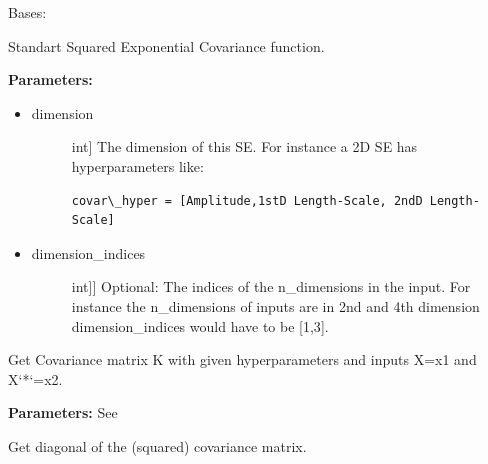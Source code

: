 \documentclass[letterpaper,10pt,english]{sphinxmanual}
\begin{document}
\begin{fulllineitems}
\label{covars:pygp.covar.se.SqexpCFARD}
Bases: 

Standart Squared Exponential Covariance function.

\textbf{Parameters:}
\begin{itemize}
\item {} \begin{description}
\item[{dimension}] \leavevmode{[}int{]}
The dimension of this SE. For instance a 2D SE has
hyperparameters like:

\begin{Verbatim}[commandchars=\\\{\}]
covar\_hyper = [Amplitude,1stD Length-Scale, 2ndD Length-Scale]
\end{Verbatim}

\end{description}

\item {} \begin{description}
\item[{dimension\_indices}] \leavevmode{[}{[}int{]}{]}
Optional: The indices of the n\_dimensions in the input.
For instance the n\_dimensions of inputs are in 2nd and
4th dimension dimension\_indices would have to be {[}1,3{]}.

\end{description}

\end{itemize}

\begin{fulllineitems}
\label{covars:pygp.covar.se.SqexpCFARD.K}
Get Covariance matrix K with given hyperparameters
and inputs X=x1 and X{}`*{}`=x2.

\textbf{Parameters:}
See {\hyperref[covars:pygp.covar.CovarianceFunction]{}}

\end{fulllineitems}


\begin{fulllineitems}
\label{covars:pygp.covar.se.SqexpCFARD.Kdiag}
Get diagonal of the (squared) covariance matrix.


\end{fulllineitems}
\end{fulllineitems}
\end{document}
